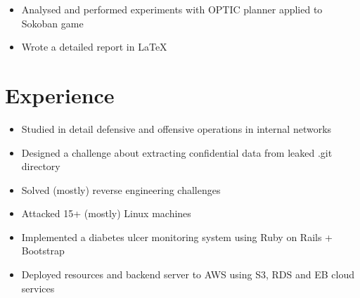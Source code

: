 \documentclass{resume}
\begin{document}
\begin{itemize}
  \item Analysed and performed experiments with OPTIC planner applied to Sokoban game
  \item Wrote a detailed report in \LaTeX
\end{itemize}


\section{Experience}
\begin{itemize}
  \item Studied in detail defensive and offensive operations in internal networks
\end{itemize}

\begin{itemize}
  \item Designed a challenge about extracting confidential data from leaked .git directory
\end{itemize}

\begin{itemize}
  \item Solved (mostly) reverse engineering challenges
  \item Attacked 15+ (mostly) Linux machines
\end{itemize}

\begin{itemize}
  \item Implemented a diabetes ulcer monitoring system using Ruby on Rails + Bootstrap
  \item Deployed resources and backend server to AWS using S3, RDS and EB cloud services
\end{itemize}
\end{document}

